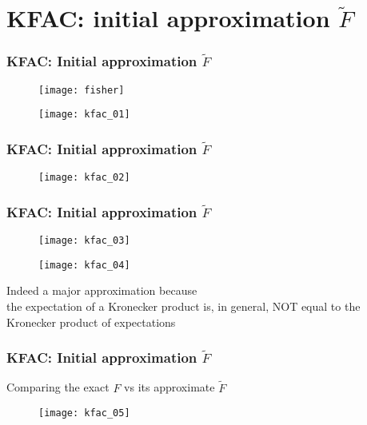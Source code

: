 \section{KFAC: initial approximation $\tilde{F}$}

\begin{frame}
\frametitle{KFAC: Initial approximation $\tilde{F}$}

\begin{figure}
    \centering
    \texttt{[image: fisher]}
\end{figure}

\begin{figure}
    \centering
    \texttt{[image: kfac\_01]}
\end{figure}

\end{frame}

\begin{frame}
\frametitle{KFAC: Initial approximation $\tilde{F}$}

\begin{figure}
    \centering
    \texttt{[image: kfac\_02]}
\end{figure}

\end{frame}

\begin{frame}
\frametitle{KFAC: Initial approximation $\tilde{F}$}

\begin{figure}
    \centering
    \texttt{[image: kfac\_03]}
\end{figure}

\begin{figure}
    \centering
    \texttt{[image: kfac\_04]}
\end{figure}

Indeed a major approximation because\\
the expectation of a Kronecker product is, in general, NOT
equal to the Kronecker product of expectations

\end{frame}

\begin{frame}
\frametitle{KFAC: Initial approximation $\tilde{F}$}
Comparing the exact $F$ vs its approximate $\tilde{F}$
\begin{figure}
    \centering
    \texttt{[image: kfac\_05]}
\end{figure}

\end{frame}


